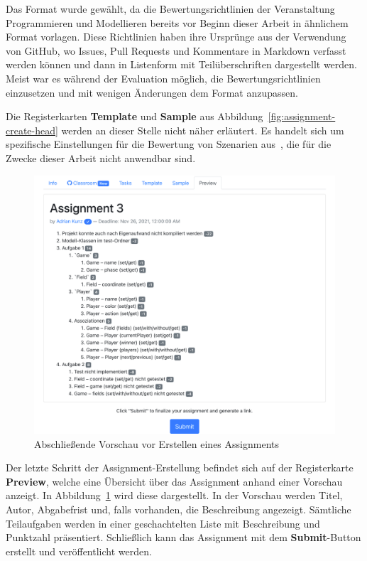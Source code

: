 Das Format wurde gewählt, da die Bewertungsrichtlinien der Veranstaltung Programmieren und Modellieren bereits vor Beginn dieser Arbeit in ähnlichem Format vorlagen.
Diese Richtlinien haben ihre Ursprünge aus der Verwendung von GitHub, wo Issues, Pull Requests und Kommentare in Markdown verfasst werden können und dann in Listenform mit Teilüberschriften dargestellt werden.
Meist war es während der Evaluation möglich, die Bewertungsrichtlinien einzusetzen und mit wenigen Änderungen dem Format anzupassen.

Die Registerkarten \textbf{Template} und \textbf{Sample} aus Abbildung~\ref{fig:assignment-create-head} werden an dieser Stelle nicht näher erläutert.
Es handelt sich um spezifische Einstellungen für die Bewertung von Szenarien aus~\cite{bachelor-thesis}, die für die Zwecke dieser Arbeit nicht anwendbar sind.

\begin{figure}
    \centering
    \includegraphics[width=\textwidth]{images/assignment-create-preview}
    \caption{Abschließende Vorschau vor Erstellen eines Assignments}
    \label{fig:assignment-create-preview}
\end{figure}

Der letzte Schritt der Assignment-Erstellung befindet sich auf der Registerkarte \textbf{Preview}, welche eine Übersicht über das Assignment anhand einer Vorschau anzeigt.
In Abbildung~\ref{fig:assignment-create-preview} wird diese dargestellt.
In der Vorschau werden Titel, Autor, Abgabefrist und, falls vorhanden, die Beschreibung angezeigt.
Sämtliche Teilaufgaben werden in einer geschachtelten Liste mit Beschreibung und Punktzahl präsentiert.
Schließlich kann das Assignment mit dem \textbf{Submit}-Button erstellt und veröffentlicht werden.

